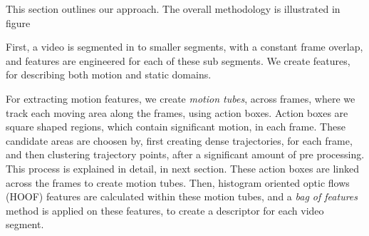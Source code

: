 

This section outlines our approach. The overall methodology is illustrated in figure




First, a video is segmented in to smaller segments, with a constant frame overlap, and features are engineered for each of these sub segments. 
We create features, for describing both motion and static domains.

For extracting motion features, we create \textit{motion tubes}, across frames, where we track each moving area along the frames, using action boxes.
Action boxes are square shaped regions, which contain significant motion, in each frame. These candidate areas are choosen by, first creating dense trajectories, for each frame,
and then clustering trajectory points, after a significant amount of pre processing. This process is explained in detail, in next section. 
These action boxes are linked across the frames to create motion tubes. Then, histogram oriented optic flows (HOOF) features are calculated within these motion tubes, and a 
\textit{bag of features}
method is applied on these features, to create a descriptor for each video segment. 

